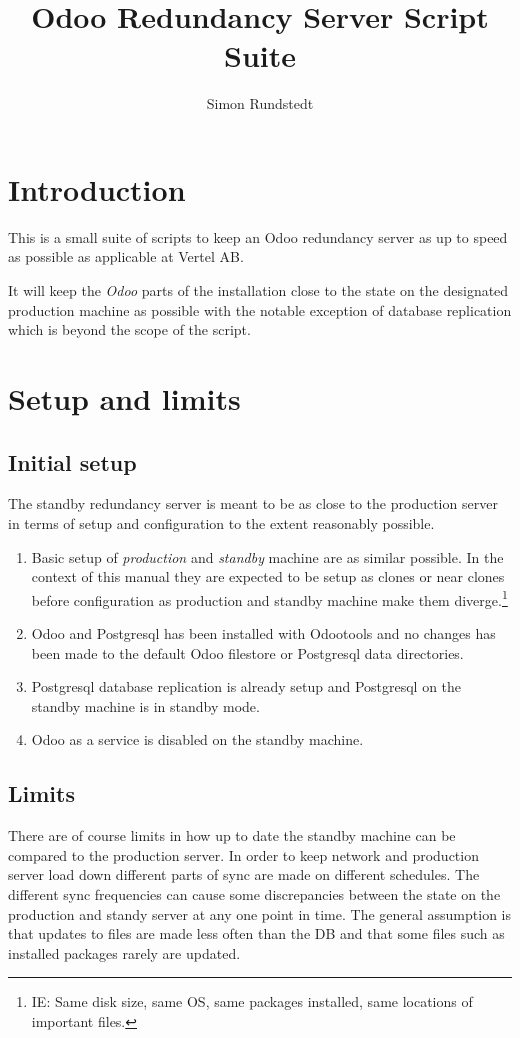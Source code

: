 \documentclass[a4paper]{article}
\title{Odoo Redundancy Server Script Suite}
\author{Simon Rundstedt}
\begin{document}
	\maketitle
	\tableofcontents
	\newpage
	
\section{Introduction}
	This is a small suite of scripts to keep an Odoo redundancy server as up to speed as possible as applicable at Vertel AB.
	
	It will keep the \emph{Odoo} parts of the installation close to the state on the designated production machine as possible with the notable exception of database replication which is beyond the scope of the script.

\section{Setup and limits}
\subsection{Initial setup}
\label{sec:setup}
	The standby redundancy server is meant to be as close to the production server in terms of setup and configuration to the extent reasonably possible.
	\begin{enumerate}
		\item Basic setup of \emph{production} and \emph{standby} machine are as similar possible. In the context of this manual they are expected to be setup as clones or near clones before configuration as production and standby machine make them diverge.\footnote{IE: Same disk size, same OS, same packages installed, same locations of important files.}
		\item Odoo and Postgresql has been installed with Odootools and no changes has been made to the default Odoo filestore or Postgresql data directories.
		\item Postgresql database replication is already setup and Postgresql on the standby machine is in standby mode.
		\item Odoo as a service is disabled on the standby machine.
	\end{enumerate}

\subsection{Limits}
	There are of course limits in how up to date the standby machine can be compared to the production server. In order to keep network and production server load down different parts of sync are made on different schedules. The different sync frequencies can cause some discrepancies between the state on the production and standy server at any one point in time.
	The general assumption is that updates to files are made less often than the DB and that some files such as installed packages rarely are updated.	
	
\end{document}
